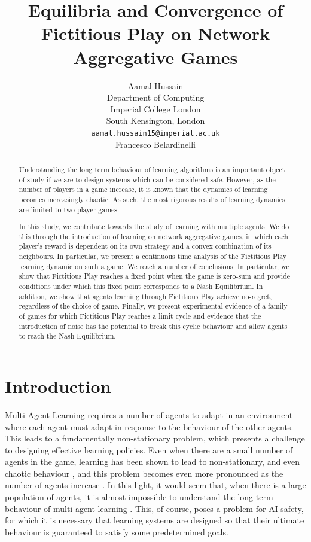 \documentclass{article}
\title{Equilibria and Convergence of Fictitious Play on Network Aggregative Games}
\author{%
 Aamal Hussain  \\
  Department of Computing\\
  Imperial College London\\
  South Kensington, London \\
  \texttt{aamal.hussain15@imperial.ac.uk} \\
  \And
  Francesco Belardinelli
}
\theoremstyle{definition}
\begin{document}
\maketitle

\begin{abstract}
  Understanding the long term behaviour of learning algorithms is an important object of study if we are to design systems which can be considered safe. However, as the number of players in a game increase, it is known that the dynamics of learning becomes increasingly chaotic. As such, the most rigorous results of learning dynamics are limited to two player games.

  In this study, we contribute towards the study of learning with multiple agents. We do this through the introduction of learning on network aggregative games, in which each player's reward is dependent on its own strategy and a convex combination of its neighbours. In particular, we present a continuous time analysis of the Fictitious Play learning dynamic on such a game. We reach a number of conclusions. In particular, we show that Fictitious Play reaches a fixed point when the game is zero-sum and provide conditions under which this fixed point corresponds to a Nash Equilibrium. In addition, we show that agents learning through Fictitious Play achieve no-regret, regardless of the choice of game. Finally, we present experimental evidence of a family of games for which Fictitious Play reaches a limit cycle and evidence that the introduction of noise has the potential to break this cyclic behaviour and allow agents to reach the Nash Equilibrium.
\end{abstract}

\section{Introduction}

Multi Agent Learning \cite{Schwartz} requires a number of agents to adapt in an environment where
each agent must adapt in response to the behaviour of the other agents. This leads to a
fundamentally non-stationary problem, which presents a challenge to designing effective learning
policies. Even when there are a small number of agents in the game, learning has been shown to lead
to non-stationary, and even chaotic behaviour \cite{SatoChaos}, and this problem becomes even more
pronounced as the number of agents increase \cite{Sanders}. In this light, it would seem that, when there is a large population of agents, it is almost impossible to understand the long term behaviour of multi agent learning \cite{PiliourasChaoticMaps}. This, of course, poses a problem for AI safety, for which it is necessary that learning systems are designed so that their ultimate behaviour is guaranteed to satisfy some predetermined goals.
\end{document}
